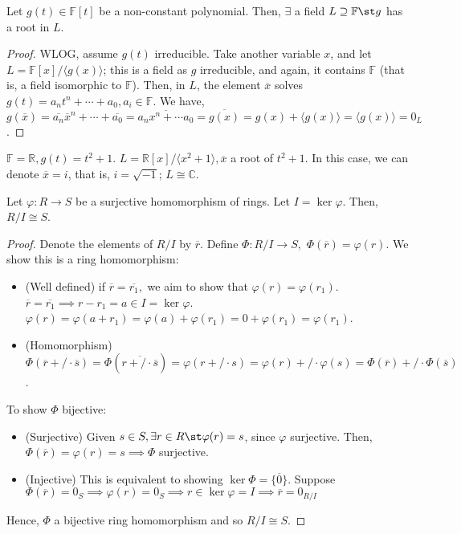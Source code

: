 \documentclass[12pt,oneside]{article}
\begin{document}
\begin{theorem}
  Let $g(t) \in \mathbb{F}[t]$ be a non-constant polynomial. Then, $\exists$ a field $L \supseteq \mathbb{F} \st g$ has a root in $L$.
\end{theorem}

\begin{proof}
  WLOG, assume $g(t)$ irreducible. Take another variable $x$, and let $L = \mathbb{F}[x]/\langle g(x) \rangle$; this is a field as $g$ irreducible, and again, it contains $\mathbb{F}$ (that is, a field isomorphic to $\mathbb{F}$). Then, in $L$, the element $\overline{x}$ solves $g(t) = a_n t^n + \cdots + a_0, a_i \in \mathbb{F}$. We have, $g(\overline{x}) = \overline{a_n} \overline{x}^{n} + \cdots + \overline{a_0} = \overline{a_n x^n + \cdots a_0} = \overline{g(x)} = g(x) + \langle g(x)\rangle = \langle g(x) \rangle = 0_L$.
\end{proof}

\begin{example}
  $\mathbb{F} = \mathbb{R}, g(t) = t^2 + 1.$ $L = \mathbb{R}[x]/\langle x^2+1\rangle, \overline{x}$ a root of $t^2 + 1$. In this case, we can denote $\overline{x} = i$, that is, $i = \sqrt{-1}$; $L \cong \mathbb{C}$.
\end{example}

\begin{theorem}\label{thm:firstiso}
  Let $\varphi: R \to S$ be a surjective homomorphism of rings. Let $I = \ker \varphi$. Then, $R/I \cong S$.
\end{theorem}

\begin{proof}
  Denote the elements of $R /I$ by $\overline{r}$. Define $\varPhi : R/I \to S,$ $\varPhi(\overline{r}) = \varphi(r)$. We show this is a ring homomorphism:
  \begin{itemize}
    \item (Well defined) if $\overline{r} = \overline{r_1},$ we aim to show that $\varphi(r) = \varphi(r_1)$. $\overline{r} = \overline{r_1} \implies r - r_1 = a \in I = \ker \varphi$. $\varphi(r) = \varphi(a+r_1) = \varphi(a) + \varphi(r_1) = 0 + \varphi(r_1) = \varphi(r_1)$.
    \item (Homomorphism) $\varPhi(\overline{r} +/\cdot \overline{s}) = \varPhi (\overline{r +/\cdot \overline{s}}) = \varphi(r + /\cdot s) = \varphi(r) +/\cdot \varphi(s) = \varPhi(\overline{r}) +/\cdot \varPhi(\overline{s})$.
  \end{itemize}
  To show $\varPhi$ bijective:
  \begin{itemize}
    \item (Surjective) Given $s \in S, \exists r \in R \st \varphi(r) = s$, since $\varphi$ surjective. Then, $\varPhi (\overline{r}) = \varphi(r) = s \implies \varPhi$ surjective.
    \item (Injective) This is equivalent to showing $\ker \varPhi = \{\overline{0}\}$. Suppose $\varPhi(\overline{r}) = 0_S \implies \varphi(r) = 0_S \implies r \in \ker \varphi = I \implies \overline{r} = 0_{R/I}$
  \end{itemize}
  Hence, $\varPhi$ a bijective ring homomorphism and so $R/I \cong S$.
\end{proof}
\end{document}

